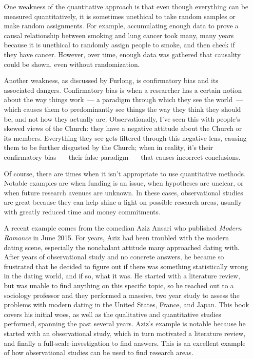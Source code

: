 \documentclass[12pt]{article}
\begin{document}
One weakness of the quantitative approach is that even though everything can be measured quantitatively, it is sometimes unethical to take random samples or make random assignments. For example, accumulating enough data to prove a causal relationship between smoking and lung cancer took many, many years because it is unethical to randomly assign people to smoke, and then check if they have cancer. However, over time, enough data was gathered that causality could be shown, even without randomization.

Another weakness, as discussed by Furlong, is confirmatory bias and its associated dangers. Confirmatory bias is when a researcher has a certain notion about the way things work~--- a paradigm through which they see the world~--- which causes them to predominantly see things the way they think they should be, and not how they actually are. Observationally, I've seen this with people's skewed views of the Church: they have a negative attitude about the Church or its members. Everything they see gets filtered through this negative lens, causing them to be further disgusted by the Church; when in reality, it's their confirmatory bias~--- their false paradigm~--- that causes incorrect conclusions.

Of course, there are times when it isn't appropriate to use quantitative methods. Notable examples are when funding is an issue, when hypotheses are unclear, or when future research avenues are unknown. In these cases, observational studies are great because they can help shine a light on possible research areas, usually with greatly reduced time and money commitments.

A recent example comes from the comedian Aziz Ansari who published \textit{Modern Romance} in June 2015. For years, Aziz had been troubled with the modern dating scene, especially the nonchalant attitude many approached dating with. After years of observational study and no concrete answers, he became so frustrated that he decided to figure out if there was something statistically wrong in the dating world, and if so, what it was. He started with a literature review, but was unable to find anything on this specific topic, so he reached out to a sociology professor and they performed a massive, two year study to assess the problems with modern dating in the United States, France, and Japan. This book covers his initial woes, as well as the qualitative and quantitative studies performed, spanning the past several years. Aziz's example is notable because he started with an observational study, which in turn motivated a literature review, and finally a full-scale investigation to find answers. This is an excellent example of how observational studies can be used to find research areas.
\end{document}
